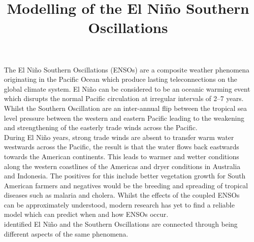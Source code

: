 \documentclass[12pt, onecolumn]{revtex4}    %
\begin{document}
                     

\title{Modelling of the El Ni\~{n}o Southern Oscillations} 

\maketitle
\thispagestyle{plain} %

The El Ni\~{n}o Southern Oscillations (ENSOs) are a composite weather phenomena originating in the Pacific Ocean which produce lasting teleconnections on the global climate system. El Ni\~{n}o can be considered to be an oceanic warming event which disrupts the normal Pacific circulation at irregular intervals of 2--7 years. Whilst the Southern Oscillation are an inter-annual flip between the tropical sea level pressure between the western and eastern Pacific leading to the weakening and strengthening of the easterly trade winds across the Pacific. \\

During El Ni\~{n}o years, strong trade winds are absent to transfer warm water westwards across the Pacific, the result is that the water flows back eastwards towards the American continents. This leads to warmer and wetter conditions along the western coastlines of the Americas and dryer conditions in Australia and Indonesia. The positives for this include better vegetation growth for South American farmers and negatives would be the breeding and spreading of tropical diseases such as malaria and cholera. Whilst the effects of the coupled ENSOs can be approximately understood, modern research has yet to find a reliable model which can predict when and how ENSOs occur. \\

\cite{doi:10.1175/1520-04931969097} identified El Ni\~{n}o and the Southern Oscillations are connected through being different aspects of the same phenomena. \\



\newpage

\nocite{wang2017nino}
\nocite{ruddiman_climate}


\end{document}
